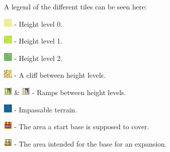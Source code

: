A legend of the different tiles can be seen here:

\begin{my_itemize}

	\item \includegraphics[scale=0.7]{Images/Tiles/Height0} - Height level 0.

	\item \includegraphics[scale=0.7]{Images/Tiles/Height1} - Height level 1.

	\item \includegraphics[scale=0.7]{Images/Tiles/Height2} - Height level 2.

	\item \includegraphics[scale=0.7]{Images/Tiles/Cliff} - A cliff between height levels.

	\item \includegraphics[scale=0.7]{Images/Tiles/Ramp01} \& \includegraphics[scale=0.7]{Images/Tiles/Ramp12} - Ramps between height levels.

	\item \includegraphics[scale=0.7]{Images/Tiles/Impassable} - Impassable terrain.

	\item \includegraphics[scale=0.7]{Images/Tiles/StartBase} - The area a start base is supposed to cover.

	\item \includegraphics[scale=0.7]{Images/Tiles/Base} - The area intended for the base for an expansion.


\end{my_itemize}
